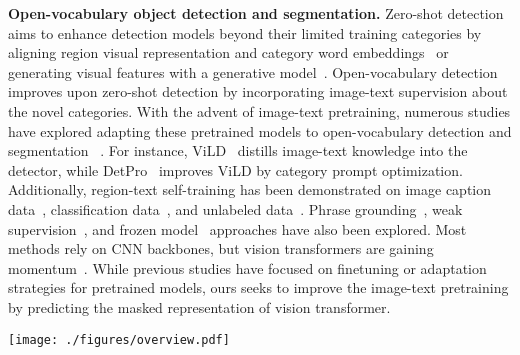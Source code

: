 \documentclass[10pt,twocolumn,letterpaper]{article}
\renewcommand{\paragraph}[1]{\vspace{1mm}\noindent\textbf{#1}}
\newcommand{\ours}{CFM-ViT\xspace}
\begin{document}
\paragraph{Open-vocabulary object detection and segmentation.}\quad
Zero-shot detection aims to enhance detection models beyond their limited training categories by aligning region visual representation and category word embeddings~\cite{bansal2018zero, rahman2020improved, demirel2018zero, zheng2020background} or generating visual features with a generative model~\cite{hayat2020synthesizing,zhu2020don}. Open-vocabulary detection~\cite{Zareian_2021_CVPR} improves upon zero-shot detection by incorporating image-text supervision about the novel categories. With the advent of image-text pretraining, numerous studies have explored adapting these pretrained models to open-vocabulary detection and segmentation ~\cite{gu2022openvocabulary,zhong2021regionclip,ghiasi2022scaling,li2022language,zhou2022maskclip}. For instance, ViLD~\cite{gu2022openvocabulary} distills image-text knowledge into the detector, while DetPro~\cite{du2022learning} improves ViLD by category prompt optimization. Additionally, region-text self-training has been demonstrated on image caption data~\cite{zhong2021regionclip}, classification data~\cite{rasheed2022bridging}, and unlabeled data~\cite{zhao2022exploiting}. Phrase grounding~\cite{li2021grounded}, weak supervision~\cite{zhou2022detecting}, and frozen model~\cite{kuo2022f} approaches have also been explored. Most methods rely on CNN backbones, but vision transformers are gaining momentum~\cite{minderer2022simple,zhou2022maskclip,kim2023region,kuo2023mammut,li2023reclip}. While previous studies have focused on finetuning or adaptation strategies for pretrained models, ours seeks to improve the image-text pretraining by predicting the masked representation of vision transformer.
 
\begin{figure*}[t]
\centering
\texttt{[image: ./figures/overview.pdf]}
\vspace{-1mm}
\caption{\textbf{\ours architecture:} We present both the image-text pretraining (left) and open-vocabulary detection finetuning (right) architecture of \ours. (Left) Building upon contrastive learning, we learn to reconstruct the masked tokens in the joint image-text embedding space. In addition, we propose Positional Embedding Dropout (PED) which randomly masks out the whole PE during pretraining to mitigate overfitting to the low-res positional embeddings, thus adapting better to the high-res downstream detection task. (Right) The open-vocabulary detector is initialized with the pretrained ViT backbone during finetuning. The detected region embeddings match with the cached category embeddings to compute the region scores. At inference, we exploit the frozen ViT backbone to obtain the VLM score , which is combined with the detection score  into the open-vocabulary detection score  (Best viewed in color). 
}
\vspace{-3mm}
\label{fig:overview}
\end{figure*}
\end{document}
